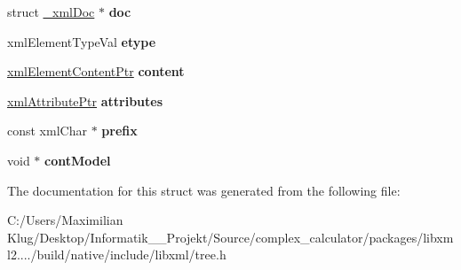\begin{DoxyCompactItemize}
\mbox{\label{struct__xml_element_a89d834f3cd5e42d21d59e7476cf5b7f9}} 
struct \mbox{\hyperlink{struct__xml_doc}{\+\_\+xml\+Doc}} $\ast$ {\bfseries doc}
\item 
\mbox{\label{struct__xml_element_a3f7566085877a63b728c8596438a9540}} 
xml\+Element\+Type\+Val {\bfseries etype}
\item 
\mbox{\label{struct__xml_element_ac934ce51a0a220c511c1700c3694e0e7}} 
\mbox{\hyperlink{struct__xml_element_content}{xml\+Element\+Content\+Ptr}} {\bfseries content}
\item 
\mbox{\label{struct__xml_element_a45468a87059e899da068a6cc04e6a943}} 
\mbox{\hyperlink{struct__xml_attribute}{xml\+Attribute\+Ptr}} {\bfseries attributes}
\item 
\mbox{\label{struct__xml_element_a5c499467a4b209f6881220594db90650}} 
const xml\+Char $\ast$ {\bfseries prefix}
\item 
\mbox{\label{struct__xml_element_a8f4ac69355ce0e5b4ddab81d91116302}} 
void $\ast$ {\bfseries cont\+Model}
\end{DoxyCompactItemize}


The documentation for this struct was generated from the following file\+:\begin{DoxyCompactItemize}
\item 
C\+:/\+Users/\+Maximilian Klug/\+Desktop/\+Informatik\+\_\+\_\+\+Projekt/\+Source/complex\+\_\+calculator/packages/libxml2..../build/native/include/libxml/tree.\+h\end{DoxyCompactItemize}
